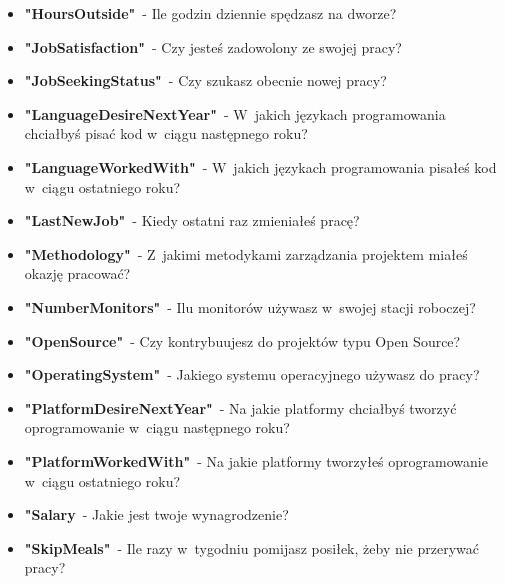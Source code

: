 \begin{appendices}
\begin{itemize}
        \item \textbf{"HoursOutside"}~- Ile godzin dziennie spędzasz na dworze?
        \item \textbf{"JobSatisfaction"}~- Czy jesteś zadowolony ze swojej pracy?
        \item \textbf{"JobSeekingStatus"}~- Czy szukasz obecnie nowej pracy?
        \item \textbf{"LanguageDesireNextYear"}~- W~jakich językach programowania chciałbyś pisać kod w~ciągu następnego roku?
        \item \textbf{"LanguageWorkedWith"}~- W~jakich językach programowania pisałeś kod w~ciągu ostatniego roku?
        \item \textbf{"LastNewJob"}~- Kiedy ostatni raz zmieniałeś pracę?
        \item \textbf{"Methodology"}~- Z~jakimi metodykami zarządzania projektem miałeś okazję pracować?
        \item \textbf{"NumberMonitors"}~- Ilu monitorów używasz w~swojej stacji roboczej?
        \item \textbf{"OpenSource"}~- Czy kontrybuujesz do projektów typu Open Source?
        \item \textbf{"OperatingSystem"}~- Jakiego systemu operacyjnego używasz do pracy?
        \item \textbf{"PlatformDesireNextYear"}~- Na jakie platformy chciałbyś tworzyć oprogramowanie w~ciągu następnego roku?
        \item \textbf{"PlatformWorkedWith"}~- Na jakie platformy tworzyłeś oprogramowanie w~ciągu ostatniego roku?
        \item \textbf{"Salary}~- Jakie jest twoje wynagrodzenie?
        \item \textbf{"SkipMeals"}~- Ile razy w~tygodniu pomijasz posiłek, żeby nie przerywać pracy?

\end{itemize}
\end{appendices}
